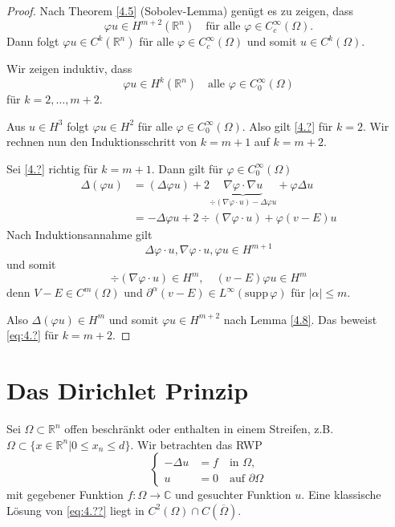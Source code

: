 \documentclass[
paper=a4,
bibtotocnumbered,
liststotocnumbered,
tablecaptionabove,
pointlessnumbers,
twoside,
openright,
10pt
]
{report}
\newcommand{\supp}{\mathrm{supp}\,}
\let\phi\varphi
\theoremstyle{definition}
\numberwithin{equation}{chapter}
\begin{document}
\begin{proof}
Nach Theorem \ref{4.5} (Sobolev-Lemma) genügt es zu zeigen, dass
\begin{equation}
\phi u \in H^{m+2}(\mathbb R^n) \quad \text{für alle } \phi \in C_c^\infty(\Omega).
\end{equation}
Dann folgt $\phi u \in C^k(\mathbb R^n)$ für alle $\phi \in C_c^\infty(\Omega)$ und somit $u\in C^k(\Omega)$.

Wir zeigen induktiv, dass
\begin{equation}
\phi u \in H^k(\mathbb R^n) \quad \text{alle } \phi \in C_0^\infty(\Omega)
\end{equation}
für $k=2, \ldots, m+2$.

Aus $u\in H^3$ folgt $\phi u\in H^2$ für alle $\phi \in C_0^\infty(\Omega)$. Also gilt \eqref{4.?} für $k=2$. Wir rechnen nun den Induktionsschritt von $k=m+1$ auf $k=m+2$.

Sei \eqref{4.?} richtig für $k=m+1$. Dann gilt für $\phi \in C_0^\infty(\Omega)$
\begin{align}
\Delta(\phi u) &= (\Delta \phi u) + 2\underbrace{\nabla \phi \cdot \nabla u}_{\div(\nabla \phi \cdot u)- \Delta \phi u} + \phi \Delta u\\
&= - \Delta \phi u + 2\div (\nabla \phi \cdot u) + \phi(v-E) u
\end{align}
Nach Induktionsannahme gilt
\begin{equation}
\Delta \phi \cdot u, \nabla \phi \cdot u, \phi u \in H^{m+1}
\end{equation}
und somit
\begin{equation}
\div(\nabla \phi \cdot u) \in H^m, \quad (v-E) \phi u \in H^m
\end{equation}
denn $V-E\in C^m(\Omega)$ und $\partial^\alpha(v-E)\in L^\infty(\supp \phi)$ für $|\alpha|\le m$.

Also $\Delta (\phi u) \in H^m$ und somit $\phi u\in H^{m+2}$ nach Lemma \ref{4.8}. Das beweist \eqref{eq:4.?} für $k=m+2$.

\end{proof}


\section{Das Dirichlet Prinzip}
Sei $\Omega \subset \mathbb R^n$ offen beschränkt oder enthalten in einem Streifen, z.B. $\Omega \subset \{ x\in \mathbb R^n| 0 \le x_n \le d\}$.  Wir betrachten das RWP
\begin{equation}\label{eq:4.??}
\begin{cases}
-\Delta u&= f \quad \text{in } \Omega,\\
u&=0 \quad \text{auf } \partial \Omega
\end{cases}
\end{equation}
mit gegebener Funktion $f: \Omega \to \mathbb C$ und gesuchter Funktion $u$. Eine klassische Lösung von \eqref{eq:4.??} liegt in $C^2(\Omega) \cap C(\overline{\Omega})$.
\end{document}
